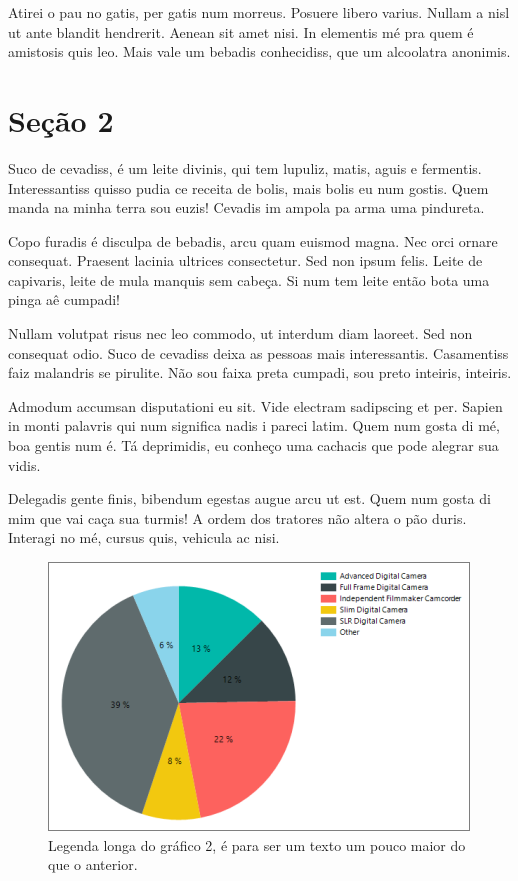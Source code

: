 \documentclass{article}
\begin{document}
	Atirei o pau no gatis, per gatis num morreus. Posuere libero varius. Nullam a nisl ut ante blandit hendrerit. Aenean sit amet nisi. In elementis mé pra quem é amistosis quis leo. Mais vale um bebadis conhecidiss, que um alcoolatra anonimis.
	
	\section{Seção 2}
	
	Suco de cevadiss, é um leite divinis, qui tem lupuliz, matis, aguis e fermentis. Interessantiss quisso pudia ce receita de bolis, mais bolis eu num gostis. Quem manda na minha terra sou euzis! Cevadis im ampola pa arma uma pindureta.
	
	Copo furadis é disculpa de bebadis, arcu quam euismod magna. Nec orci ornare consequat. Praesent lacinia ultrices consectetur. Sed non ipsum felis. Leite de capivaris, leite de mula manquis sem cabeça. Si num tem leite então bota uma pinga aê cumpadi!
	
	Nullam volutpat risus nec leo commodo, ut interdum diam laoreet. Sed non consequat odio. Suco de cevadiss deixa as pessoas mais interessantis. Casamentiss faiz malandris se pirulite. Não sou faixa preta cumpadi, sou preto inteiris, inteiris.
	
	Admodum accumsan disputationi eu sit. Vide electram sadipscing et per. Sapien in monti palavris qui num significa nadis i pareci latim. Quem num gosta di mé, boa gentis num é. Tá deprimidis, eu conheço uma cachacis que pode alegrar sua vidis.
	
	Delegadis gente finis, bibendum egestas augue arcu ut est. Quem num gosta di mim que vai caça sua turmis! A ordem dos tratores não altera o pão duris. Interagi no mé, cursus quis, vehicula ac nisi.
	
	\begin{figure}[H] 
		\centering
		\includegraphics[width=1\linewidth]{images/grafico2}
		\caption[Legenda curta do gráfico 2]{Legenda longa do gráfico 2, é para ser um texto um pouco maior do que o anterior.}
		\label{fig:grafico2}
	\end{figure}
	
\end{document}
